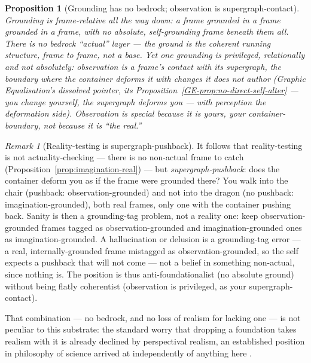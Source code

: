 \documentclass[11pt,a4paper]{article}
\newtheorem{proposition}[definition]{Proposition}
\theoremstyle{remark}\newtheorem{remark}[definition]{Remark}
\begin{document}
\begin{proposition}[Grounding has no bedrock; observation is supergraph-contact]\label{prop:grounding}
Grounding is frame-relative all the way down: a frame grounded in a frame grounded in a
frame, with no absolute, self-grounding frame beneath them all. There is no bedrock
``actual'' layer --- the ground is the coherent running structure, frame to frame, not a
base. Yet one grounding is privileged, relationally and not absolutely: \emph{observation}
is a frame's contact with its supergraph, the boundary where the container deforms it with
changes it does not author (Graphic Equalisation's dissolved pointer,
its Proposition~\ref{GE-prop:no-direct-self-alter} --- you change
yourself, the supergraph deforms you --- with perception the deformation side). Observation
is special because it is \emph{yours}, your container-boundary, not because it is ``the
real.''
\end{proposition}

\begin{remark}[Reality-testing is supergraph-pushback]\label{rem:pushback}
It follows that reality-testing is not actuality-checking --- there is no
non-actual frame to catch (Proposition~\ref{prop:imagination-real}) --- but
\emph{supergraph-pushback}: does the container deform you as if the frame were grounded
there? You walk into the chair (pushback: observation-grounded) and not into the dragon
(no pushback: imagination-grounded), both real frames, only one with the container pushing
back. Sanity is then a grounding-tag problem, not a reality one: keep observation-grounded
frames tagged as observation-grounded and imagination-grounded ones as
imagination-grounded. A hallucination or delusion is a grounding-tag error --- a real,
internally-grounded frame mistagged as observation-grounded, so the self expects a pushback
that will not come --- not a belief in something non-actual, since nothing is. The position
is thus anti-foundationalist (no absolute ground) without being flatly coherentist
(observation is privileged, as your supergraph-contact).
\end{remark}

That combination --- no bedrock, and no loss of realism for lacking one --- is not
peculiar to this substrate: the standard worry that dropping a foundation takes realism
with it is already declined by perspectival realism, an established position in
philosophy of science arrived at independently of anything here
\citep{massimi2022}.
\end{document}
